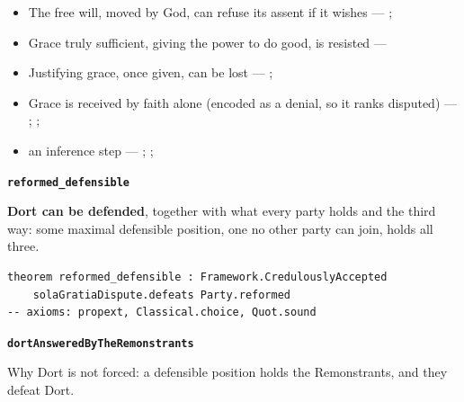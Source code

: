 \documentclass[11pt]{article}
\begin{document}
\begin{itemize}
\begin{itemize}
\item The free will, moved by God, can refuse its assent if it wishes --- \cite[Trent, Session VI (1547), canon 4]{tanner-decrees-1990}; \cite[45]{waterworth-trent-1848}
\item Grace truly sufficient, giving the power to do good, is resisted --- \cite[ch. VI]{garrigou-lagrange-grace-1952}
\item Justifying grace, once given, can be lost --- \cite[II-II q.24 a.11]{aquinas-summa-1920}; \cite[Trent, Session VI (1547), canon 23]{tanner-decrees-1990}
\item Grace is received by faith alone (encoded as a denial, so it ranks disputed) --- \cite[II-II q.4 a.3]{aquinas-summa-1920}; \cite[I-II q.113 a.4 ad 1]{aquinas-summa-1920}; \cite[Trent, Session VI (1547), canon 9]{tanner-decrees-1990}
\item an inference step --- \cite{pohle-molinism-1911}; \cite[I-II q.112 a.3]{aquinas-summa-1920}; \cite[ch. VII]{garrigou-lagrange-grace-1952}
\end{itemize}
\end{itemize}
\par\medskip\noindent\textbf{\texttt{reformed\_\allowbreak{}defensible}}\par\nobreak\noindent
\textbf{Dort can be defended}, together with what every party holds and the third way: some maximal defensible position, one no other party can join, holds all three.

{\small\begin{verbatim}
theorem reformed_defensible : Framework.CredulouslyAccepted
    solaGratiaDispute.defeats Party.reformed
-- axioms: propext, Classical.choice, Quot.sound
\end{verbatim}}
\par\medskip\noindent\textbf{\texttt{dort\allowbreak{}Answered\allowbreak{}By\allowbreak{}The\allowbreak{}Remonstrants}}\par\nobreak\noindent
Why Dort is not forced: a defensible position holds the Remonstrants, and they defeat Dort.
\end{document}

